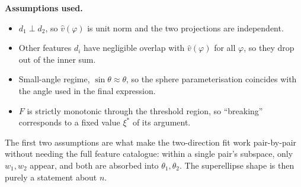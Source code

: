 \documentclass[11pt]{article}
\begin{document}
\medskip
\noindent\textbf{Assumptions used.}
\begin{itemize}
\item $d_1 \perp d_2$, so $\hat v(\varphi)$ is unit norm and the two projections are independent.
\item Other features $d_i$ have negligible overlap with $\hat v(\varphi)$ for all $\varphi$, so they drop out of the inner sum.
\item Small-angle regime, $\sin\theta \approx \theta$, so the sphere parameterisation coincides with the angle used in the final expression.
\item $F$ is strictly monotonic through the threshold region, so ``breaking'' corresponds to a fixed value $\xi^*$ of its argument.
\end{itemize}

\noindent The first two assumptions are what make the two-direction fit work pair-by-pair without needing the full feature catalogue: within a single pair's subspace, only $w_1, w_2$ appear, and both are absorbed into $\theta_1, \theta_2$. The superellipse shape is then purely a statement about $n$.
\end{document}
